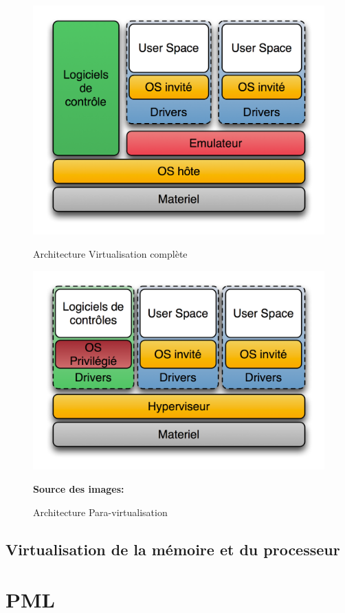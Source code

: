 \begin{figure}[ht!]
\begin{minipage}{0.49\textwidth}
        \centering
        \includegraphics[width=1\linewidth,height=\hauteurgraphiques]{fig1/virtualisation_complete.png}
        \caption{Architecture Virtualisation complète}
        \label{fig:virualisation_complete}
    \end{minipage}
    \hspace{\fill}
    \begin{minipage}{0.49\textwidth}
        \centering
        \includegraphics[width=1\linewidth,height=\hauteurgraphiques]{fig1/para_virtualisation.png}
        \caption{Architecture Para-virtualisation}
        \label{fig:para_virtualisation}
    \end{minipage}
    \vspace{20px}
    \centering \bfseries Source des images: \cite{online2}
\end{figure}

\subsection{Virtualisation de la mémoire et du processeur}

\section{PML}